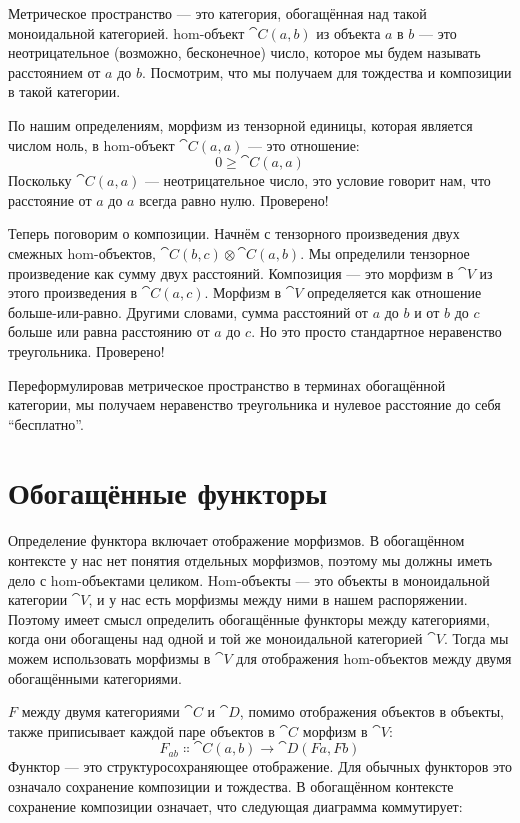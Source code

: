 Метрическое пространство — это категория, обогащённая над такой моноидальной категорией.
hom-объект $\cat{C}(a, b)$ из объекта $a$ в $b$ — это
неотрицательное (возможно, бесконечное) число, которое мы будем называть расстоянием
от $a$ до $b$. Посмотрим, что мы получаем для тождества и
композиции в такой категории.

По нашим определениям, морфизм из тензорной единицы, которая является
числом ноль, в hom-объект $\cat{C}(a, a)$ — это отношение:
\[0 \geqslant \cat{C}(a, a)\]
Поскольку $\cat{C}(a, a)$ — неотрицательное число, это условие говорит
нам, что расстояние от $a$ до $a$ всегда равно нулю.
Проверено!

Теперь поговорим о композиции. Начнём с тензорного произведения
двух смежных hom-объектов, $\cat{C}(b, c) \otimes \cat{C}(a, b)$. Мы определили
тензорное произведение как сумму двух расстояний. Композиция — это
морфизм в $\cat{V}$ из этого произведения в $\cat{C}(a, c)$. Морфизм
в $\cat{V}$ определяется как отношение больше-или-равно. Другими словами,
сумма расстояний от $a$ до $b$ и от $b$
до $c$ больше или равна расстоянию от $a$
до $c$. Но это просто стандартное неравенство треугольника. Проверено!

Переформулировав метрическое пространство в терминах обогащённой категории, мы получаем
неравенство треугольника и нулевое расстояние до себя ``бесплатно''.

\section{Обогащённые функторы}

Определение функтора включает отображение морфизмов. В
обогащённом контексте у нас нет понятия отдельных морфизмов, поэтому
мы должны иметь дело с hom-объектами целиком. Hom-объекты — это объекты в
моноидальной категории $\cat{V}$, и у нас есть морфизмы между ними в нашем
распоряжении. Поэтому имеет смысл определить обогащённые функторы между
категориями, когда они обогащены над одной и той же моноидальной категорией
$\cat{V}$. Тогда мы можем использовать морфизмы в $\cat{V}$ для отображения hom-объектов
между двумя обогащёнными категориями.

 $F$ между двумя категориями $\cat{C}$
и $\cat{D}$, помимо отображения объектов в объекты, также приписывает каждой
паре объектов в $\cat{C}$ морфизм в $\cat{V}$:
\[F_{a b} \Colon \cat{C}(a, b) \to \cat{D}(F a, F b)\]
Функтор — это структуросохраняющее отображение. Для обычных функторов это
означало сохранение композиции и тождества. В обогащённом контексте
сохранение композиции означает, что следующая диаграмма коммутирует:


